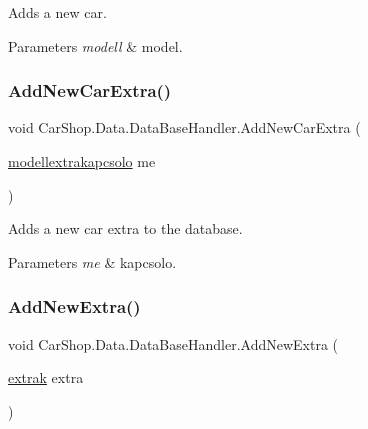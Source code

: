 Adds a new car. 


\begin{DoxyParams}{Parameters}
{\em modell} & model.\\
\hline
\end{DoxyParams}
\mbox{\label{class_car_shop_1_1_data_1_1_data_base_handler_a20d8fe16deb78c4e3cd284e03db8a667}} 
\subsubsection{\texorpdfstring{Add\+New\+Car\+Extra()}{AddNewCarExtra()}}
{\footnotesize\ttfamily void Car\+Shop.\+Data.\+Data\+Base\+Handler.\+Add\+New\+Car\+Extra (\begin{DoxyParamCaption}\item[{\mbox{\hyperlink{class_car_shop_1_1_data_1_1modellextrakapcsolo}{modellextrakapcsolo}}}]{me }\end{DoxyParamCaption})}



Adds a new car extra to the database. 


\begin{DoxyParams}{Parameters}
{\em me} & kapcsolo.\\
\hline
\end{DoxyParams}
\mbox{\label{class_car_shop_1_1_data_1_1_data_base_handler_a5f0973e7680a685c73f1ccec00b75701}} 
\subsubsection{\texorpdfstring{Add\+New\+Extra()}{AddNewExtra()}}
{\footnotesize\ttfamily void Car\+Shop.\+Data.\+Data\+Base\+Handler.\+Add\+New\+Extra (\begin{DoxyParamCaption}\item[{\mbox{\hyperlink{class_car_shop_1_1_data_1_1extrak}{extrak}}}]{extra }\end{DoxyParamCaption})}



